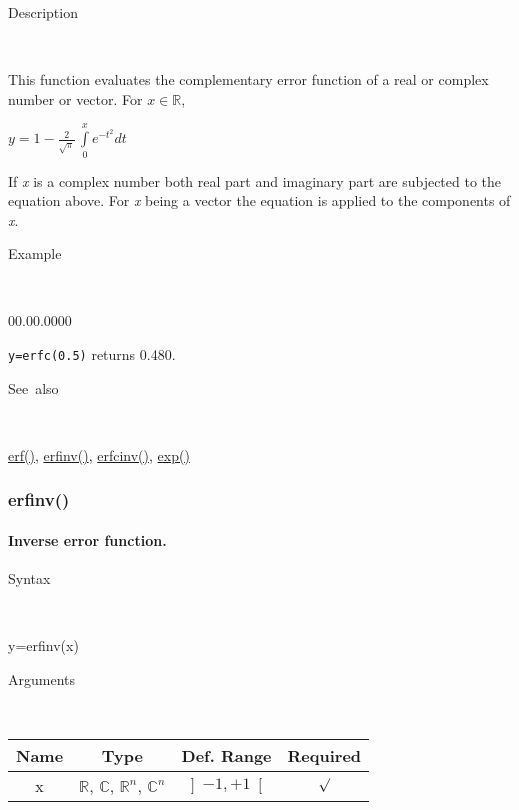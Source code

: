 \begin{description}
\item [Description]~
\end{description}
This function evaluates the complementary error function of a real
or complex number or vector. For $x\in\mathbb{R}$,

\medskip{}
$y={\displaystyle 1-\frac{2}{\sqrt{\pi}}\,\int\limits _{0}^{x}e^{-t^{2}}dt}$
\medskip{}

If \textit{x} is a complex number both real part and imaginary
part are subjected to the equation above. For \textit{x} being a vector
the equation is applied to the components of \textit{x}.

\begin{description}
\item [Example]~
\end{description}
\begin{lyxlist}{00.00.0000}
\item [\texttt{y=erfc(0.5)}]returns 0.480.
\end{lyxlist}
\begin{description}
\item [See~also]~
\end{description}
\textcolor{blue}{\hyperlink{erf}{erf()}}\textcolor{black}{,} \textcolor{blue}{\hyperlink{erfinv}{erfinv()}}\textcolor{black}{,}
\textcolor{blue}{\hyperlink{erfcinv}{erfcinv()}}\textcolor{black}{,}
\textcolor{blue}{\hyperlink{exp}{exp()}}


\newpage
\subsubsection*{\hypertarget{erfinv}{}{\Large erfinv()}}


\paragraph{\label{par:Inverse-error-function}Inverse error function.}

\begin{description}
\item [Syntax]~
\end{description}
y=erfinv(x)

\begin{description}
\item [Arguments]~
\end{description}
\begin{tabular}{|c|c|c|c|}
\hline 
Name&
Type&
Def. Range&
Required\tabularnewline
\hline
\hline 
x&
$\mathbb{R}$, $\mathbb{C}$, $\mathbb{R}^{n}$, $\mathbb{C}^{n}$&
$\left]-1,+1\right[$&
$\surd$\tabularnewline
\hline
\end{tabular}

